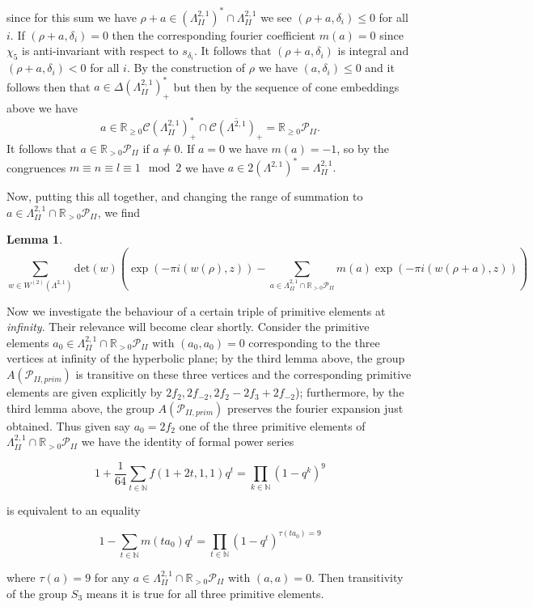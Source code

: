 \documentclass[9pt]{amsart} \usepackage[utf8]{inputenc}
\newtheorem{lemma}{Lemma}
\newcommand{\N}{\mathbb{N}}
\newcommand{\R}{\mathbb{R}} \newcommand{\La}{\Lambda}
\newcommand{\Cone}{\mathcal{C}}
\newcommand{\Poly}{\mathcal{P}}
\begin{document}
since for this sum we have $\rho +a \in (\La^{2,1}_{II})^* \cap
\La^{2,1}_{II}$ we see $(\rho +a, \delta_i) \leq 0$ for all $i$. If
$(\rho + a, \delta_i) = 0$ then the corresponding fourier coefficient
$m(a) = 0$ since $\chi_5$ is anti-invariant with respect to
$s_{\delta_i}$. It follows that $(\rho +a, \delta_i)$ is integral and
$(\rho +a, \delta_i) < 0$ for all $i$. By the construction of $\rho$ we
have $(a, \delta_i) \leq 0$ and it follows then that $a \in
\Delta(\La^{2,1}_{II})^*_+$ but then by the sequence of cone embeddings
above we have $$a \in \R_{\geq 0} \Cone(\La^{2,1}_{II})_+^* \cap
\overline{\Cone(\La^{2,1})_+} = \R_{\geq 0} \Poly_{II}.$$ It follows
that $a \in \R_{>0}\Poly_{II}$ if $a \neq 0$. If $a = 0$ we have $m(a) =
-1$, so by the congruences $m\equiv n \equiv l \equiv 1 \mod 2$ we have $a \in 2
(\La^{2,1})^* = \La^{2,1}_{II}.$


Now, putting this all together, and changing the range of summation to
$a \in \La^{2,1}_{II} \cap \R_{> 0}\Poly_{II}$, we find
\begin{lemma}
$$\displaystyle\sum_{w \in W^{(2)}(\La^{2,1})} \text{det}(w)( \exp(-\pi
i(w(\rho),z))- \sum_{a \in \La^{2,1}_{II}\cap\R_{>0}\Poly_{II}}
m(a)\exp(-\pi i(w(\rho+a),z)))$$
\end{lemma}

Now we investigate the behaviour of a certain triple of primitive
elements at \textit{infinity}. Their relevance will become clear
shortly. Consider the primitive elements $a_0 \in \La^{2,1}_{II} \cap
\R_{>0} \Poly_{II}$ with $(a_0,a_0) = 0$ corresponding to the three
vertices at infinity of the hyperbolic plane; by the third lemma above, the group
$A(\Poly_{II,prim})$ is transitive on these three vertices and the
corresponding primitive elements are given explicitly by $2f_2, 2f_{-2},
2f_2 - 2f_3 + 2 f_{-2}$); furthermore, by the third lemma above, the
group $A(\Poly_{II,prim})$ preserves the fourier expansion just
obtained. Thus given say $a_0 = 2 f_2$ one of the three primitive
elements of $\La^{2,1}_{II} \cap \R_{>0}\Poly_{II}$ we have the identity
of formal power series

$$1 + \frac{1}{64} \sum_{t \in \N} f(1 + 2t, 1, 1)q^t = \displaystyle\prod_{k\in \N} (1
- q^k)^9$$

is equivalent to an equality

$$ 1 - \sum_{t \in \N} m(t a_0) q^t = \displaystyle\prod_{t\in \N}
(1 - q^t)^{\tau(t a_0) = 9 }$$

where $\tau(a) = 9$ for any  $a \in \La^{2,1}_{II} \cap \R_{>0}
\Poly_{II}$ with $(a,a) = 0$. Then transitivity
of the group $S_3$ means it is true for all three primitive elements.
\end{document}
